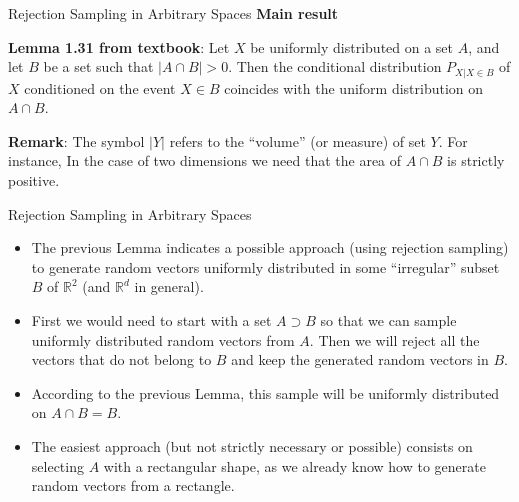 \documentclass[8pt]{beamer}
\begin{document}
\begin{frame}{Rejection Sampling in Arbitrary Spaces}
\textbf{Main result}

\vspace{2mm}

\textbf{Lemma 1.31 from textbook}: Let $X$ be uniformly distributed on a set $A$, and let $B$ be a set such that $|A \cap B| >0$. Then the conditional distribution $P_{X| X \in B}$ of $X$ conditioned on the event $X \in B$ coincides with the uniform distribution on $A \cap B$.

\vspace{2mm}

\textbf{Remark}: The symbol $ |Y| $ refers to the ``volume'' (or measure) of set $Y$. For instance, In the case of two dimensions we need that the area of $A\cap B$ is strictly positive. 
\end{frame}

\begin{frame}{Rejection Sampling in Arbitrary Spaces}
\begin{itemize}
	\item The previous Lemma indicates a possible approach (using rejection sampling) to generate random  vectors uniformly distributed in some ``irregular'' subset $B$ of $\mathbb{R}^2$ (and $\mathbb{R}^d$ in general).
	\item First we would need to start with a set $A \supset B$ so that we can sample uniformly distributed random vectors from $A$.
Then we will reject all the vectors that do not belong to $B$ and keep the generated random vectors in $B$. 
	\item According to the previous Lemma, this sample will be uniformly distributed on $A\cap B=B$.
	\item The easiest approach (but not strictly necessary or possible)
consists on selecting $A$ with a rectangular shape, as we already know how to generate random vectors from a rectangle.
\end{itemize} 
\end{frame}
\end{document}
